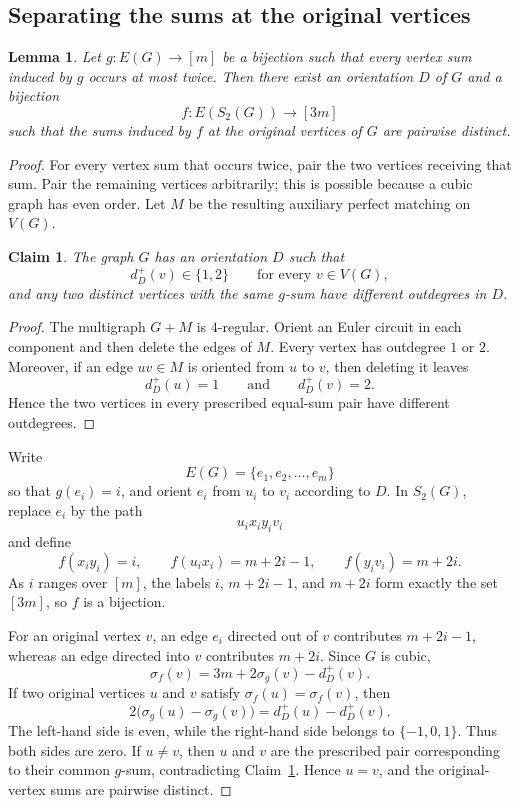\documentclass[preprint,12pt]{elsarticle}
\newtheorem{lemma}[theorem]{Lemma}
\newtheorem{claim}{Claim}[section]
\begin{document}
\subsection{Separating the sums at the original vertices}
\label{subsec:separating-original-sums}

\begin{lemma}
\label{lem:orientation-transfer}
Let \(g:E(G)\to[m]\) be a bijection such that every vertex sum induced by
\(g\) occurs at most twice. Then there exist an orientation \(D\) of \(G\)
and a bijection
\[
f:E(S_2(G))\longrightarrow[3m]
\]
such that the sums induced by \(f\) at the original vertices of \(G\) are
pairwise distinct.
\end{lemma}

\begin{proof}
For every vertex sum that occurs twice, pair the two vertices receiving
that sum. Pair the remaining vertices arbitrarily; this is possible
because a cubic graph has even order. Let \(M\) be the resulting
auxiliary perfect matching on \(V(G)\).

\begin{claim}
\label{clm:orientation}
The graph \(G\) has an orientation \(D\) such that
\[
d_D^+(v)\in\{1,2\}
\qquad\text{for every }v\in V(G),
\]
and any two distinct vertices with the same \(g\)-sum have different
outdegrees in \(D\).
\end{claim}

\begin{proof}
The multigraph \(G+M\) is \(4\)-regular. Orient an Euler circuit in each
component and then delete the edges of \(M\). Every vertex has outdegree
\(1\) or \(2\). Moreover, if an edge \(uv\in M\) is oriented from \(u\)
to \(v\), then deleting it leaves
\[
d_D^+(u)=1
\qquad\text{and}\qquad
d_D^+(v)=2.
\]
Hence the two vertices in every prescribed equal-sum pair have different
outdegrees.
\end{proof}

Write
\[
E(G)=\{e_1,e_2,\ldots,e_m\}
\]
so that \(g(e_i)=i\), and orient \(e_i\) from \(u_i\) to \(v_i\)
according to \(D\). In \(S_2(G)\), replace \(e_i\) by the path
\[
u_i x_i y_i v_i
\]
and define
\[
f(x_i y_i)=i,\qquad
f(u_i x_i)=m+2i-1,\qquad
f(y_i v_i)=m+2i.
\]
As \(i\) ranges over \([m]\), the labels \(i\), \(m+2i-1\), and \(m+2i\)
form exactly the set \([3m]\), so \(f\) is a bijection.

For an original vertex \(v\), an edge \(e_i\) directed out of \(v\)
contributes \(m+2i-1\), whereas an edge directed into \(v\) contributes
\(m+2i\). Since \(G\) is cubic,
\[
\sigma_f(v)=3m+2\sigma_g(v)-d_D^+(v).
\]
If two original vertices \(u\) and \(v\) satisfy
\(\sigma_f(u)=\sigma_f(v)\), then
\[
2\bigl(\sigma_g(u)-\sigma_g(v)\bigr)
=
d_D^+(u)-d_D^+(v).
\]
The left-hand side is even, while the right-hand side belongs to
\(\{-1,0,1\}\). Thus both sides are zero. If \(u\ne v\), then \(u\) and
\(v\) are the prescribed pair corresponding to their common \(g\)-sum,
contradicting Claim~\ref{clm:orientation}. Hence \(u=v\), and the
original-vertex sums are pairwise distinct.
\end{proof}
\end{document}
